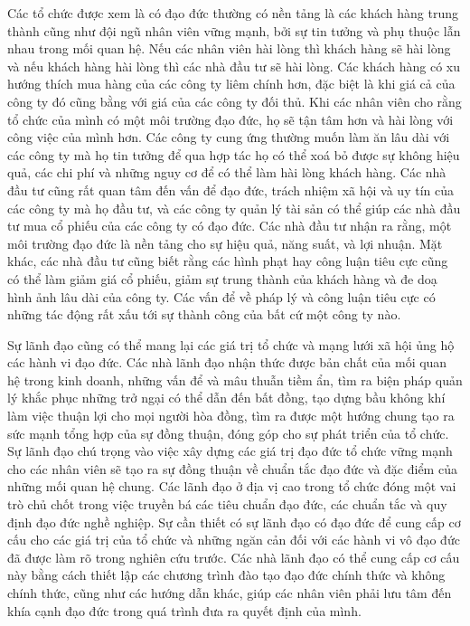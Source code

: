 \documentclass{article}
\begin{document}
\begin{itemize}
                \qquad Các tổ chức được xem là có đạo đức thường có nền tảng là các khách hàng trung thành cũng như đội ngũ nhân viên vững mạnh, bởi sự tin tưởng và phụ thuộc lẫn nhau trong mối quan hệ. Nếu các nhân viên hài lòng thì khách hàng sẽ hài lòng và nếu khách hàng hài lòng thì các nhà đầu tư sẽ hài lòng. Các khách hàng có xu hướng thích mua hàng của các công ty liêm chính hơn, đặc biệt là khi giá cả của công ty đó cũng bằng với giá của các công ty đối thủ. Khi các nhân viên cho rằng tổ chức của mình có một môi trường đạo đức, họ sẽ tận tâm hơn và hài lòng với công việc của mình hơn. Các công ty cung ứng thường muốn làm ăn lâu dài với các công ty mà họ tin tưởng để qua hợp tác họ có thể xoá bỏ được sự không hiệu quả, các chi phí và những nguy cơ để có thể làm hài lòng khách hàng. Các nhà đầu tư cũng rất quan tâm đến vấn để đạo đức, trách nhiệm xã hội và uy tín của các công ty mà họ đầu tư, và các công ty quản lý tài sản có thể giúp các nhà đầu tư mua cổ phiếu của các công ty có đạo đức. Các nhà đầu tư nhận ra rằng, một môi trường đạo đức là nền tảng cho sự hiệu quả, năng suất, và lợi nhuận. Mặt khác, các nhà đầu tư cũng biết rằng các hình phạt hay công luận tiêu cực cũng có thể làm giảm giá cổ phiếu, giảm sự trung thành của khách hàng và đe doạ hình ảnh lâu dài của công ty. Các vấn để về pháp lý và công luận tiêu cực có những tác động rất xấu tới sự thành công của bất cứ một công ty nào.

                \qquad Sự lãnh đạo cũng có thể mang lại các giá trị tổ chức và mạng lưới xã hội ủng hộ các hành vi đạo đức. Các nhà lãnh đạo nhận thức được bản chất của mối quan hệ trong kinh doanh, những vấn để và mâu thuẫn tiềm ẩn, tìm ra biện pháp quản lý khắc phục những trở ngại có thể dẫn đến bất đồng, tạo dựng bầu không khí làm việc thuận lợi cho mọi người hòa đồng, tìm ra được một hướng chung tạo ra sức mạnh tổng hợp của sự đồng thuận, đóng góp cho sự phát triển của tổ chức. Sự lãnh đạo chú trọng vào việc xây dựng các giá trị đạo đức tổ chức vững mạnh cho các nhân viên sẽ tạo ra sự đồng thuận về chuẩn tắc đạo đức và đặc điểm của những mối quan hệ chung. Các lãnh đạo ở địa vị cao trong tổ chức đóng một vai trò chủ chốt trong việc truyền bá các tiêu chuẩn đạo đức, các chuẩn tắc và quy định đạo đức nghề nghiệp. Sự cần thiết có sự lãnh đạo có đạo đức để cung cấp cơ cấu cho các giá trị của tổ chức và những ngăn cản đối với các hành vi vô đạo đức đã được làm rõ trong nghiên cứu trước. Các nhà lãnh đạo có thể cung cấp cơ cấu này bằng cách thiết lập các chương trình đào tạo đạo đức chính thức và không chính thức, cũng như các hướng dẫn khác, giúp các nhân viên phải lưu tâm đến khía cạnh đạo đức trong quá trình đưa ra quyết định của mình.


\end{itemize}
\end{document}
